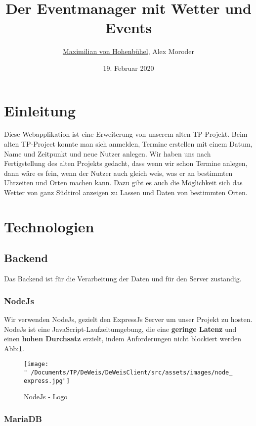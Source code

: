 \documentclass{scrartcl}
\title{Der Eventmanager mit Wetter und Events}
\author{\underline{Maximilian von Hohenbühel}, Alex Moroder}
\date{19. Februar 2020}
\begin{document}
\maketitle
\tableofcontents
\section{Einleitung}

Diese Webapplikation ist eine Erweiterung von unserem alten TP-Projekt. 
Beim alten TP-Project konnte man sich anmelden, Termine erstellen mit einem Datum, Name und Zeitpunkt und neue Nutzer anlegen.
Wir haben uns nach Fertigstellung des alten Projekts gedacht, dass wenn wir schon Termine anlegen, dann wäre es fein, 
    wenn der Nutzer auch gleich weis, was er an bestimmten Uhrzeiten und Orten machen kann. Dazu gibt es auch die Möglichkeit 
    sich das Wetter von ganz Südtirol anzeigen zu Lassen und Daten von bestimmten Orten.

    \section{Technologien}

    \subsection{Backend}

    Das Backend ist für die Verarbeitung der Daten und für den Server zustandig.

    \subsubsection{NodeJs}

    Wir verwenden NodeJs, gezielt den ExpressJs Server um unser Projekt zu hosten.
    NodeJs ist eine JavaScript-Laufzeitumgebung, die eine \textbf{geringe Latenz} und einen \textbf{hohen Durchsatz} erzielt, 
    indem Anforderungen nicht blockiert werden Abb:\ref{fig:node}.
    \begin{figure}[h]
    \centering
    \texttt{[image: "~/Documents/TP/DeWeis/DeWeisClient/src/assets/images/node\_express.jpg"]}
    \caption{NodeJs - Logo}
    \label{fig:node}
    \end{figure}

    \subsubsection{MariaDB}
\end{document}
